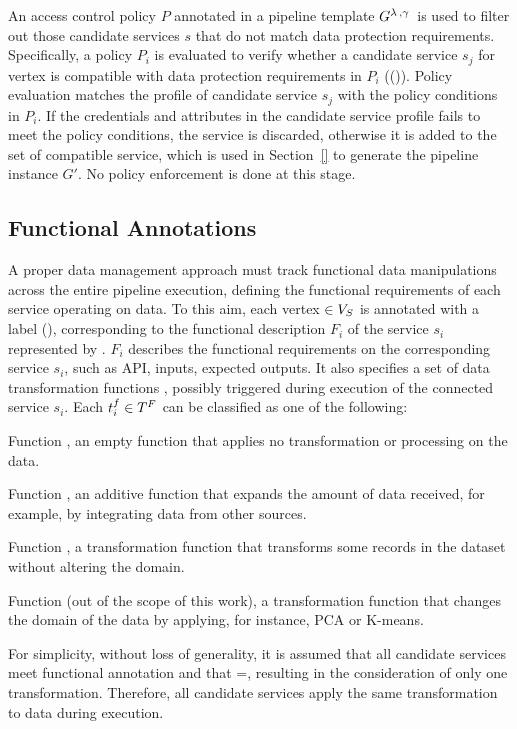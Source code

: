 An access control policy $P$ annotated in a pipeline template $G^{\lambda\,,\gamma\,}$ is used to filter out those candidate services $s$ that do not match data protection requirements. Specifically, a policy $P_i$ is evaluated to verify whether a candidate service $s_j$ for vertex  is compatible with data protection requirements in $P_i$ (\myLambda()). Policy evaluation matches the profile of candidate service $s_j$ with the policy conditions in $P_i$. If the credentials and attributes in the candidate service profile fails to meet the policy conditions, the service is discarded, otherwise it is added to the set of compatible service, which is used in Section~\ref{} to generate the pipeline instance $G'$. No policy enforcement is done at this stage.

\subsection{Functional Annotations \myGamma}\label{sec:funcannotation}
A proper data management approach must track functional data manipulations across the entire pipeline execution, defining the functional requirements of each service operating on data.
To this aim, each vertex $\in V_S$ is annotated with a label \myGamma(), corresponding to the functional description $F_i$ of the service $s_i$ represented by .
$F_i$ describes the functional requirements on the corresponding service $s_i$, such as API, inputs, expected outputs.
It also specifies a set \TF{} of data transformation functions , possibly triggered during execution of the connected service $s_i$.
Each $t^f_{i}\in T^F_{}$ can be classified as one of the following:
\begin{enumerate*}[label=\roman*)]
  \item Function \tf{\epsilon}, an empty function that applies no transformation or processing on the data.
  \item Function , an additive function that expands the amount of data received, for example, by integrating data from other sources.
  \item Function , a transformation function that transforms some records in the dataset without altering the domain.
  \item Function  (out of the scope of this work), a transformation function that changes the domain of the data by applying, for instance, PCA or K-means.
\end{enumerate*}
For simplicity, without loss of generality, it is assumed that all candidate services meet functional annotation \F{} and that \TF{}=\tf{}, resulting in the consideration of only one transformation.
Therefore, all candidate services apply the same transformation to data during execution.


